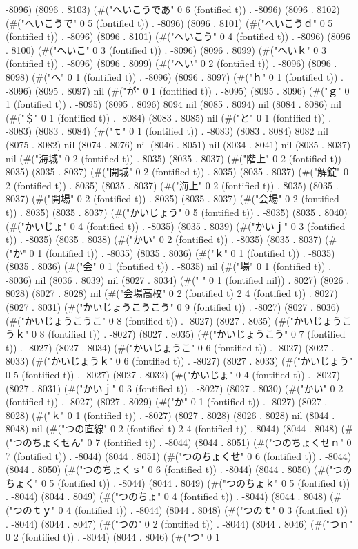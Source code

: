 -8096) (8096 . 8103) (#("へいこうであ" 0 6 (fontified t)) . -8096) (8096 . 8102) (#("へいこうで" 0 5 (fontified t)) . -8096) (8096 . 8101) (#("へいこうｄ" 0 5 (fontified t)) . -8096) (8096 . 8101) (#("へいこう" 0 4 (fontified t)) . -8096) (8096 . 8100) (#("へいこ" 0 3 (fontified t)) . -8096) (8096 . 8099) (#("へいｋ" 0 3 (fontified t)) . -8096) (8096 . 8099) (#("へい" 0 2 (fontified t)) . -8096) (8096 . 8098) (#("へ" 0 1 (fontified t)) . -8096) (8096 . 8097) (#("ｈ" 0 1 (fontified t)) . -8096) (8095 . 8097) nil (#("が" 0 1 (fontified t)) . -8095) (8095 . 8096) (#("ｇ" 0 1 (fontified t)) . -8095) (8095 . 8096) 8094 nil (8085 . 8094) nil (8084 . 8086) nil (#("＄" 0 1 (fontified t)) . -8084) (8083 . 8085) nil (#("と" 0 1 (fontified t)) . -8083) (8083 . 8084) (#("ｔ" 0 1 (fontified t)) . -8083) (8083 . 8084) 8082 nil (8075 . 8082) nil (8074 . 8076) nil (8046 . 8051) nil (8034 . 8041) nil (8035 . 8037) nil (#("海城" 0 2 (fontified t)) . 8035) (8035 . 8037) (#("階上" 0 2 (fontified t)) . 8035) (8035 . 8037) (#("開城" 0 2 (fontified t)) . 8035) (8035 . 8037) (#("解錠" 0 2 (fontified t)) . 8035) (8035 . 8037) (#("海上" 0 2 (fontified t)) . 8035) (8035 . 8037) (#("開場" 0 2 (fontified t)) . 8035) (8035 . 8037) (#("会場" 0 2 (fontified t)) . 8035) (8035 . 8037) (#("かいじょう" 0 5 (fontified t)) . -8035) (8035 . 8040) (#("かいじょ" 0 4 (fontified t)) . -8035) (8035 . 8039) (#("かいｊ" 0 3 (fontified t)) . -8035) (8035 . 8038) (#("かい" 0 2 (fontified t)) . -8035) (8035 . 8037) (#("か" 0 1 (fontified t)) . -8035) (8035 . 8036) (#("ｋ" 0 1 (fontified t)) . -8035) (8035 . 8036) (#("会" 0 1 (fontified t)) . -8035) nil (#("場" 0 1 (fontified t)) . -8036) nil (8036 . 8039) nil (8027 . 8034) (#(" " 0 1 (fontified nil)) . 8027) (8026 . 8028) (8027 . 8028) nil (#("会場高校" 0 2 (fontified t) 2 4 (fontified t)) . 8027) (8027 . 8031) (#("かいじょうこうこう" 0 9 (fontified t)) . -8027) (8027 . 8036) (#("かいじょうこうこ" 0 8 (fontified t)) . -8027) (8027 . 8035) (#("かいじょうこうｋ" 0 8 (fontified t)) . -8027) (8027 . 8035) (#("かいじょうこう" 0 7 (fontified t)) . -8027) (8027 . 8034) (#("かいじょうこ" 0 6 (fontified t)) . -8027) (8027 . 8033) (#("かいじょうｋ" 0 6 (fontified t)) . -8027) (8027 . 8033) (#("かいじょう" 0 5 (fontified t)) . -8027) (8027 . 8032) (#("かいじょ" 0 4 (fontified t)) . -8027) (8027 . 8031) (#("かいｊ" 0 3 (fontified t)) . -8027) (8027 . 8030) (#("かい" 0 2 (fontified t)) . -8027) (8027 . 8029) (#("か" 0 1 (fontified t)) . -8027) (8027 . 8028) (#("ｋ" 0 1 (fontified t)) . -8027) (8027 . 8028) (8026 . 8028) nil (8044 . 8048) nil (#("つの直線" 0 2 (fontified t) 2 4 (fontified t)) . 8044) (8044 . 8048) (#("つのちょくせん" 0 7 (fontified t)) . -8044) (8044 . 8051) (#("つのちょくせｎ" 0 7 (fontified t)) . -8044) (8044 . 8051) (#("つのちょくせ" 0 6 (fontified t)) . -8044) (8044 . 8050) (#("つのちょくｓ" 0 6 (fontified t)) . -8044) (8044 . 8050) (#("つのちょく" 0 5 (fontified t)) . -8044) (8044 . 8049) (#("つのちょｋ" 0 5 (fontified t)) . -8044) (8044 . 8049) (#("つのちょ" 0 4 (fontified t)) . -8044) (8044 . 8048) (#("つのｔｙ" 0 4 (fontified t)) . -8044) (8044 . 8048) (#("つのｔ" 0 3 (fontified t)) . -8044) (8044 . 8047) (#("つの" 0 2 (fontified t)) . -8044) (8044 . 8046) (#("つｎ" 0 2 (fontified t)) . -8044) (8044 . 8046) (#("つ" 0 1 